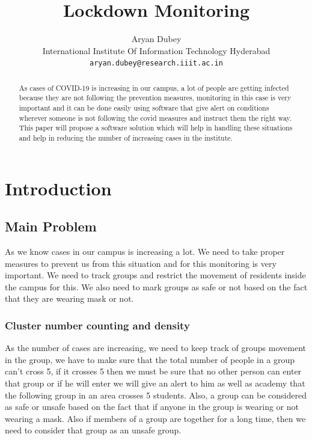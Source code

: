 \documentclass[10pt,twocolumn,letterpaper]{article}
\begin{document}
\title{Lockdown Monitoring}
\author{Aryan Dubey\\
International Institute Of Information Technology Hyderabad\\
{\tt\small aryan.dubey@research.iiit.ac.in}
}

\maketitle

\begin{abstract}
   As cases of COVID-19 is increasing in our campus, a lot of people are getting infected because they are not following the prevention measures, monitoring in this case is very important and it can be done easily using software that give alert on conditions wherever someone is not following the covid measures and instruct them the right way. This paper will propose a software solution which will help in handling these situations and help in reducing the number of increasing cases in the institute.  
\end{abstract}

\section{Introduction}
\subsection{Main Problem}

As we know cases in our campus is increasing a lot. We need to take proper measures to prevent us from this situation and for this monitoring is very important. We need to track groups and restrict the movement of residents inside the campus for this. We also need to mark groups as safe or not based on the fact that they are wearing mask or not.

\subsubsection{Cluster number counting and density}
As the number of cases are increasing, we need to keep track of groups movement in the group, we have to make sure that the total number of people in a group can't cross 5, if it crosses 5 then we must be sure that no other person can enter that group or if he will enter we will give an alert to him as well as academy that the following group in an area crosses 5 students. Also, a group can be considered as safe or unsafe based on the fact that if anyone in the group is wearing or not wearing a mask. Also if members of a group are together for a long time, then we need to consider that group as an unsafe group.
\end{document}
